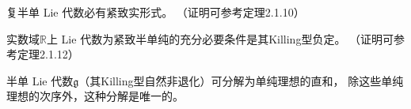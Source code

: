 
\begin{theorem}\label{chlg:thm_semi-cx-rc}
    复半单 Lie 代数必有紧致实形式。
    （证明可参考\parencite[p.109]{xuyc-2001}定理2.1.10）
\end{theorem}


\begin{theorem}\label{chlg:thm_LA-semi-real-compact}
    实数域$\mathbb{R}$上 Lie 代数为{\kaishu 紧致半单纯}的充分必要条件是其Killing型负定。
    （证明可参考\parencite[p.113]{xuyc-2001}定理2.1.12）
\end{theorem}




\begin{theorem}\label{chlg:thm_LA-Decom-semi}
    半单 Lie 代数$\mathfrak{g}$（其Killing型自然非退化）可分解为单纯理想的直和，
    除这些单纯理想的次序外，这种分解是唯一的。
\end{theorem}
